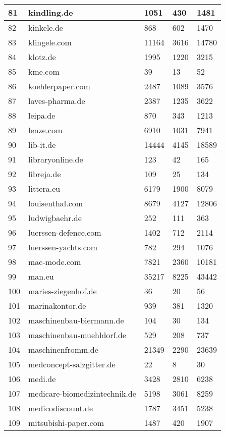\begin{longtable}{|m{0.5cm}|m{5cm}|m{2cm}|m{2cm}|m{2cm}|}
	81 & kindling.de & 1051 & 430 & 1481\\
	\hline
	82 & kinkele.de & 868 & 602 & 1470\\
	\hline
	83 & klingele.com & 11164 & 3616 & 14780\\
	\hline
	84 & klotz.de & 1995 & 1220 & 3215\\
	\hline
	85 & kme.com & 39 & 13 & 52\\
	\hline
	86 & koehlerpaper.com & 2487 & 1089 & 3576\\
	\hline
	87 & laves-pharma.de & 2387 & 1235 & 3622\\
	\hline
	88 & leipa.de & 870 & 343 & 1213\\
	\hline
	89 & lenze.com & 6910 & 1031 & 7941\\
	\hline
	90 & lib-it.de & 14444 & 4145 & 18589\\
	\hline
	91 & libraryonline.de & 123 & 42 & 165\\
	\hline
	92 & libreja.de & 109 & 25 & 134\\
	\hline
	93 & littera.eu & 6179 & 1900 & 8079\\
	\hline
	94 & louisenthal.com & 8679 & 4127 & 12806\\
	\hline
	95 & ludwigbaehr.de & 252 & 111 & 363\\
	\hline
	96 & luerssen-defence.com & 1402 & 712 & 2114\\
	\hline
	97 & luerssen-yachts.com & 782 & 294 & 1076\\
	\hline
	98 & mac-mode.com & 7821 & 2360 & 10181\\
	\hline
	99 & man.eu & 35217 & 8225 & 43442\\
	\hline
	100 & maries-ziegenhof.de & 36 & 20 & 56\\
	\hline
	101 & marinakontor.de & 939 & 381 & 1320\\
	\hline
	102 & maschinenbau-biermann.de & 104 & 30 & 134\\
	\hline
	103 & maschinenbau-muehldorf.de & 529 & 208 & 737\\
	\hline
	104 & maschinenfromm.de & 21349 & 2290 & 23639\\
	\hline
	105 & medconcept-salzgitter.de & 22 & 8 & 30\\
	\hline
	106 & medi.de & 3428 & 2810 & 6238\\
	\hline
	107 & medicare-biomedizintechnik.de & 5198 & 3061 & 8259\\
	\hline
	108 & medicodiscount.de & 1787 & 3451 & 5238\\
	\hline
	109 & mitsubishi-paper.com & 1487 & 420 & 1907\\

\end{longtable}
